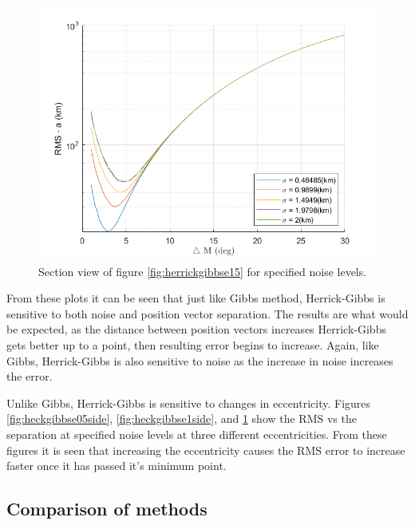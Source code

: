 \documentclass[12pt]{article}
\begin{document}
\begin{figure}[H]
	\centering
	\includegraphics[width=0.7\linewidth]{heck_gibbs_e_15_side}
	\caption{Section view of figure \ref{fig:herrickgibbse15} for specified noise levels.}
	\label{fig:heckgibbse15side}
\end{figure}

	From these plots it can be seen that just like Gibbs method, Herrick-Gibbs is sensitive to both noise and position vector separation. The results are what would be expected, as the distance between position vectors increases Herrick-Gibbs gets better up to a point, then resulting error begins to increase. Again, like Gibbs, Herrick-Gibbs is also sensitive to noise as the increase in noise increases the error. \par

Unlike Gibbs, Herrick-Gibbs is sensitive to changes in eccentricity. Figures \ref{fig:heckgibbse05side}, \ref{fig:heckgibbse1side}, and \ref{fig:heckgibbse15side} show the RMS vs the separation at specified noise levels at three different eccentricities. From these figures it is seen that increasing the eccentricity causes the RMS error to increase faster once it has passed it's minimum point.\par 
 

	\subsection{Comparison of methods}
	
\end{document}

